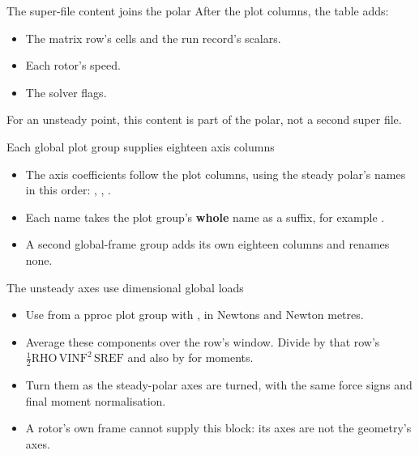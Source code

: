 \begin{frame}{The super-file content joins the polar}
\small After the plot columns, the table adds:
\begin{itemize}
  \item The matrix row's cells and the run record's scalars.
  \item Each rotor's speed.
  \item The solver flags.
\end{itemize}
\begin{takeaway}
For an unsteady point, this content is part of the polar, not a second super file.
\end{takeaway}
\end{frame}

\begin{frame}{Each global plot group supplies eighteen axis columns}
\begin{itemize}\small
  \item The axis coefficients follow the plot columns, using the steady
        polar's names in this order:
        , , .
  \item Each name takes the plot group's \textbf{whole} name as a suffix,
        for example .
  \item A second global-frame group adds its own eighteen columns
        and renames none.
\end{itemize}
\end{frame}

\begin{frame}{The unsteady axes use dimensional global loads}
\begin{itemize}\small
  \item Use  from a pproc plot group with
        , in Newtons and Newton metres.
  \item Average these components over the row's window.
        Divide by that row's
        $\tfrac12\mathrm{RHO}\,\mathrm{VINF}^2\,\mathrm{SREF}$
        and also by  for moments.
  \item Turn them as the steady-polar axes are turned, with the same
        force signs and final moment normalisation.
  \item A rotor's own frame cannot supply this block: its axes are not
        the geometry's axes.
\end{itemize}
\end{frame}

